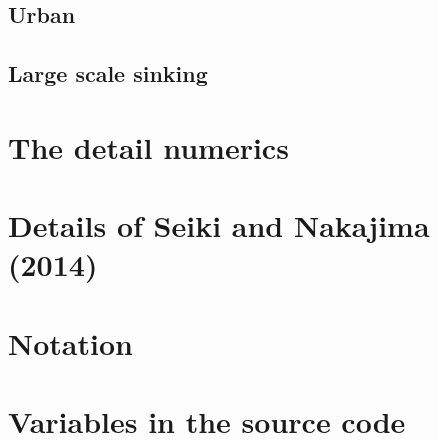 \documentclass[a4paper]{report}
\begin{document}
\section{Urban}


%

\section{Large scale sinking}





\appendix
\chapter{The detail numerics}



\chapter{Details of Seiki and Nakajima (2014)}
\label{app:sn14}


\chapter{Notation}


\chapter{Variables in the source code}

\end{document}
